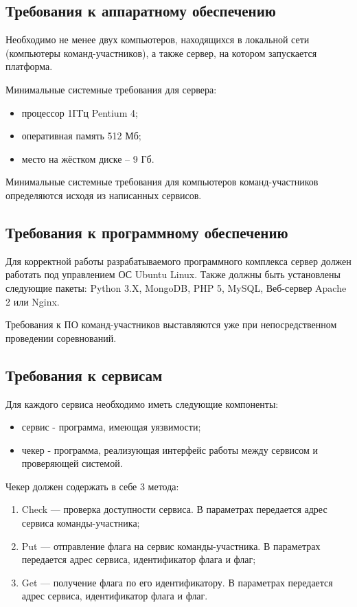 \subsection {Требования к аппаратному обеспечению}

Необходимо не менее двух компьютеров, находящихся в локальной сети (компьютеры команд-участников), а также сервер, на котором запускается платформа.

Минимальные системные требования для сервера:

\begin{itemize}
\item процессор 1ГГц Pentium 4;
\item оперативная память 512 Мб;
\item место на жёстком диске -- 9 Гб.
\end{itemize}

Минимальные системные требования для компьютеров команд-участников определяются исходя из написанных сервисов.

\subsection {Требования к программному обеспечению}
Для корректной работы разрабатываемого программного комплекса сервер должен работать под управлением ОС Ubuntu Linux. 
Также должны быть установлены следующие пакеты: Python 3.X, MongoDB, PHP 5, MySQL, Веб-сервер Apache 2 или Nginx.


Требования к ПО команд-участников выставляются уже при непосредственном проведении соревнований.

\subsection {Требования к сервисам}
Для каждого сервиса необходимо иметь следующие компоненты:

\begin{itemize}
\item сервис - программа, имеющая уязвимости;
\item чекер - программа, реализующая интерфейс работы между сервисом и проверяющей системой.
\end{itemize}

Чекер должен содержать в себе 3 метода:

\begin{enumerate}
\item Check --- проверка доступности сервиса. В параметрах передается адрес сервиса команды-участника;
\item Put --- отправление флага на сервис команды-участника. В параметрах передается адрес сервиса, идентификатор флага и флаг;
\item Get --- получение флага по его идентификатору. В параметрах передается адрес сервиса, идентификатор флага и флаг.
\end{enumerate}

